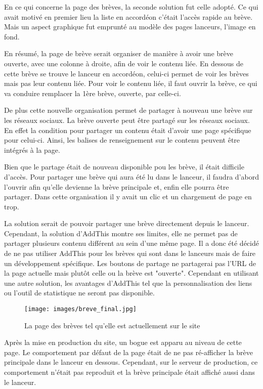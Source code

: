 \documentclass[12pt,a4paper]{article}
\begin{document}
En ce qui concerne la page des brèves, la seconde solution fut celle adopté. Ce qui avait motivé en premier lieu la liste en accordéon c'était l'accès rapide au brève. Mais un aspect graphique fut emprunté au modèle des pages lanceurs, l'image en fond.\par 
\medskip
En résumé, la page de brève serait organiser de manière à avoir une brève ouverte, avec une colonne à droite, afin de voir le contenu liée. En dessous de cette brève se trouve le lanceur en accordéon, celui-ci permet de voir les brèves mais pas leur contenu liée. Pour voir le contenu liée, il faut ouvrir la brève, ce qui va conduire remplacer la 1ère brève, ouverte, par celle-ci.\par
De plus cette nouvelle organisation permet de partager à nouveau une brève sur les réseaux sociaux. La brève ouverte peut être partagé sur les réseaux sociaux. En effet la condition pour partager un contenu était d'avoir une page spécifique pour celui-ci. Ainsi, les balises de renseignement sur le contenu peuvent être intégrés à la page.\par 
Bien que le partage était de nouveau disponible pou les brève, il était difficile d'accès. Pour partager une brève qui aura été lu dans le lanceur, il faudra d'abord l'ouvrir afin qu'elle devienne la brève principale et, enfin elle pourra être partager. Dans cette organisation il y avait un clic et un chargement de page en trop.\par 
La solution serait de pouvoir partager une brève directement depuis le lanceur. Cependant, la solution d'AddThis montre ses limites, elle ne permet pas de partager plusieurs contenu différent au sein d'une même page. Il a donc été décidé de ne pas utiliser AddThis pour les brèves qui sont dans le lanceurs mais de faire un développement spécifique. Les boutons de partage ne partagerai pas l'URL de la page actuelle mais plutôt celle ou la brève est "ouverte". Cependant en utilisant une autre solution, les avantages d'AddThis tel que la personnalisation des liens ou l'outil de statistique ne seront pas disponible.\par
\begin{figure}[h!]
\centering\texttt{[image: images/breve\_final.jpg]} 
\caption{La page des brèves tel qu'elle est actuellement sur le site}
\end{figure}
\bigskip
Après la mise en production du site, un bogue est apparu au niveau de cette page. Le comportement par défaut de la page était de ne pas ré-afficher la brève principale dans le lanceur en dessous. Cependant, sur le serveur de production, ce comportement n'était pas reproduit et la brève principale était affiché aussi dans le lanceur.\par 
\end{document}
